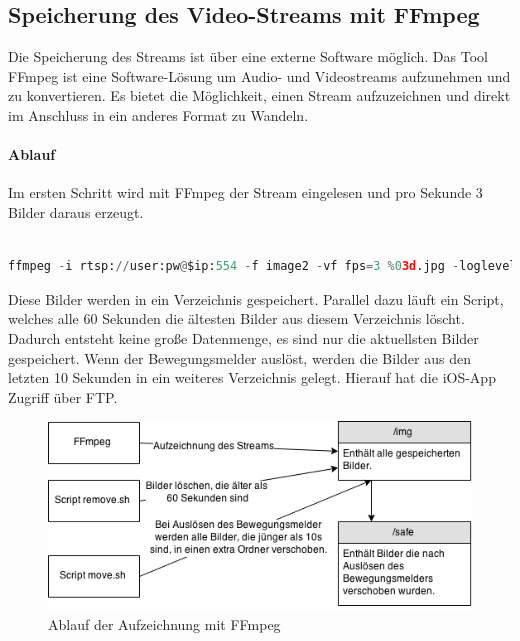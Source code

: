\subsection{Speicherung des Video-Streams mit FFmpeg}
Die Speicherung des Streams ist über eine externe Software möglich. Das Tool FFmpeg\cite{ffmpeg} ist eine Software-Lösung um Audio- und Videostreams aufzunehmen und zu konvertieren. Es bietet die Möglichkeit, einen Stream aufzuzeichnen und direkt im Anschluss in ein anderes Format zu Wandeln\cite{ffmpeg-tips}. 
\paragraph{Ablauf}
Im ersten Schritt wird mit FFmpeg der Stream eingelesen und pro Sekunde 3 Bilder daraus erzeugt. \\\\
\begin{lstlisting}[caption = Aufnahme mit FFmpeg und Konvertierung in Bilder (3FPS), language=python, frame=single, breaklines=true,columns=fullflexible, commentstyle=\color{gray}\upshape, captionpos=b]
ffmpeg -i rtsp://user:pw@$ip:554 -f image2 -vf fps=3 %03d.jpg -loglevel quiet
\end{lstlisting}
Diese Bilder werden in ein Verzeichnis gespeichert. Parallel dazu läuft ein Script, welches alle 60 Sekunden die ältesten Bilder aus diesem Verzeichnis löscht. Dadurch entsteht keine große Datenmenge, es sind nur die aktuellsten Bilder gespeichert. Wenn der Bewegungsmelder auslöst, werden die Bilder aus den letzten 10 Sekunden in ein weiteres Verzeichnis gelegt. Hierauf hat die iOS-App Zugriff über FTP.  \\
\begin{figure}[h]
\begin{minipage}{\textwidth}
	\centering
	\includegraphics[width=\textwidth]{./data/ffmpeg.png}
	\caption{Ablauf der Aufzeichnung mit FFmpeg}
\end{minipage}
\end{figure}
